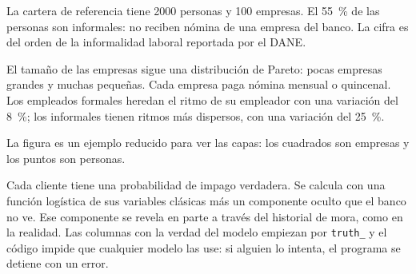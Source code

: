 \begin{decir}
La cartera de referencia tiene 2000 personas y 100 empresas. El 55~\% de las personas
son informales: no reciben nómina de una empresa del banco. La cifra es del orden de la
informalidad laboral reportada por el DANE.

El tamaño de las empresas sigue una distribución de Pareto: pocas empresas grandes y
muchas pequeñas. Cada empresa paga nómina mensual o quincenal. Los empleados formales
heredan el ritmo de su empleador con una variación del 8~\%; los informales tienen
ritmos más dispersos, con una variación del 25~\%.

La figura es un ejemplo reducido para ver las capas: los cuadrados son empresas y los
puntos son personas.

Cada cliente tiene una probabilidad de impago verdadera. Se calcula con una función
logística de sus variables clásicas más un componente oculto que el banco no ve. Ese
componente se revela en parte a través del historial de mora, como en la realidad. Las
columnas con la verdad del modelo empiezan por \texttt{truth\_} y el código impide que
cualquier modelo las use: si alguien lo intenta, el programa se detiene con un error.
\end{decir}
